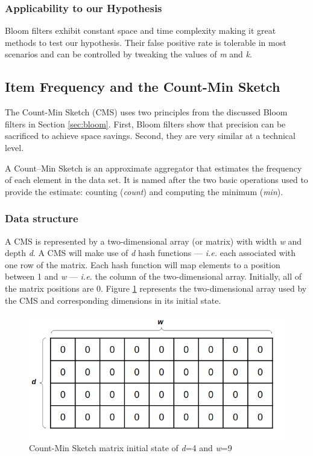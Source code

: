 \subsubsection*{Applicability to our Hypothesis}
Bloom filters exhibit constant space and time complexity making it great methods to test our hypothesis. Their false positive rate is tolerable in most scenarios and can be controlled by tweaking the values of \textit{m} and \textit{k}.

\subsection{Item Frequency and the Count-Min Sketch}
The Count-Min Sketch (CMS) uses two principles from the discussed Bloom filters in Section \ref{sec:bloom}. First, Bloom filters show that precision can be sacrificed to achieve space savings. Second, they are very similar at a technical level.

A Count–Min Sketch \cite{Cormode-CMS} is an approximate aggregator that estimates the frequency of each element in the data set. It is named after the two basic operations used to provide the estimate: counting (\textit{count}) and computing the minimum (\textit{min}).

\subsubsection*{Data structure}
A CMS is represented by a two-dimensional array (or matrix) with width \textit{w} and depth \textit{d}. A CMS will make use of \textit{d} hash functions --- \textit{i.e.} each associated with one row of the matrix. Each hash function will map elements to a position between 1 and \textit{w} --- \textit{i.e.} the column of the two-dimensional array. Initially, all of the matrix positions are 0. Figure \ref{fig:initial-cms} represents the two-dimensional array used by the CMS and corresponding dimensions in its initial state. 

\begin{figure}[!htb]
    \begin{center}
      \includegraphics[scale=0.5]{figures/initial-cms.png}
      \caption[Count-Min Sketch initial state]{Count-Min Sketch matrix initial state of \textit{d}=4 and \textit{w}=9}
      \label{fig:initial-cms}
    \end{center}
\end{figure}

